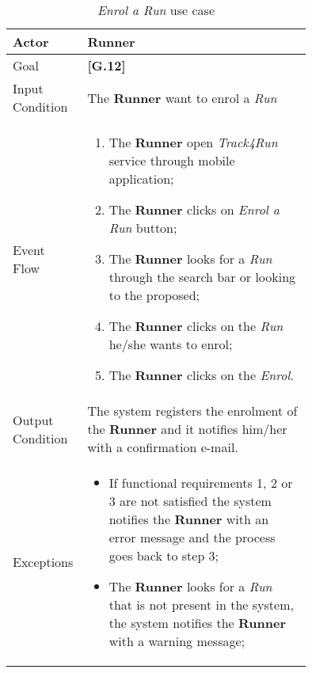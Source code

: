 \begin{center}
\begin{table}
\begin{tabular}{ | l | p{0.75\linewidth} | }
  \hline
    Actor & \textbf{Runner} \\ \hline
    Goal & \textbf{[G.12]} \\ \hline
    Input Condition & The \textbf{Runner} want to enrol a \textit{Run} \\ \hline
    Event Flow & \begin{minipage}[t]{0.7\textwidth}
      \begin{enumerate}
        \item The \textbf{Runner} open \textit{Track4Run} service through mobile application;
        \item The \textbf{Runner} clicks on \textit{Enrol a Run} button;
        \item The \textbf{Runner} looks for a \textit{Run} through the search bar or looking to the proposed;
        \item The \textbf{Runner} clicks on the \textit{Run} he/she wants to enrol;
        \item The \textbf{Runner} clicks on the \textit{Enrol}.
      \end{enumerate}
    \smallskip
  \end{minipage} \\ \hline
  Output Condition & The system registers the enrolment of the \textbf{Runner} and it notifies him/her with a confirmation e-mail. \\ \hline
  Exceptions & \begin{minipage}[t]{0.7\textwidth}
    \begin{itemize}
      \smallskip
      \item If functional requirements 1, 2 or 3 are not satisfied the system notifies the \textbf{Runner} with an error message and the process goes back to step 3;
      \item The \textbf{Runner} looks for a \textit{Run} that is not present in the system, the system notifies the \textbf{Runner} with a warning message;
    \end{itemize}
    \smallskip
  \end{minipage}  \\ \hline
\end{tabular}
\caption{\textit{Enrol a Run} use case}
\label{table:enrolRunTable}
\end{table}
\end{center}
